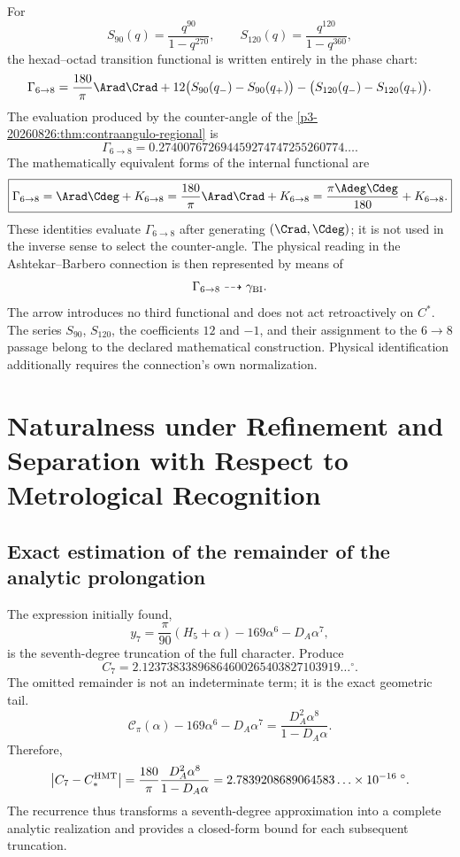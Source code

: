 For
\[
S_{90}(q)=\frac{q^{90}}{1-q^{270}},
\qquad
S_{120}(q)=\frac{q^{120}}{1-q^{360}},
\]
the hexad--octad transition functional is written entirely in the
phase chart:
\[
\Gamma_{6\to8}
=\frac{180}{\pi}\Arad\Crad
+12\bigl(S_{90}(q_-)-S_{90}(q_+)\bigr)
-\bigl(S_{120}(q_-)-S_{120}(q_+)\bigr).
\]
The evaluation produced by the counter-angle of the
\cref{p3-20260826:thm:contraangulo-regional} is
\[
\boxed{
\Gamma_{6\to8}
=0.274007672694459274747255260774\ldots.}
\]
The mathematically equivalent forms of the internal functional are
\[
\boxed{
\Gamma_{6\to8}
=\Arad\Cdeg+K_{6\to8}
=\frac{180}{\pi}\Arad\Crad+K_{6\to8}
=\frac{\pi\Adeg\Cdeg}{180}+K_{6\to8}.}
\]
These identities evaluate \(\Gamma_{6\to8}\) after generating
\((\Crad,\Cdeg)\); it is not used in the inverse sense to select the
counter-angle. The physical reading in the Ashtekar--Barbero connection is
then represented by means of
\[
 \Gamma_{6\to8}\dashrightarrow\gamma_{\rm BI}.
\]
The arrow introduces no third functional and does not act retroactively on \(C^*\). The
series \(S_{90}\), \(S_{120}\), the coefficients \(12\) and \(-1\), and their
assignment to the \(6\to8\) passage belong to the declared mathematical
construction. Physical identification additionally requires the connection's own
normalization.

\section{Naturalness under Refinement and Separation with Respect to Metrological Recognition}
\label{sec:s102:c38:7}

\subsection{Exact estimation of the remainder of the analytic prolongation}
\label{sec:s102:c38:7:1}


The expression initially found,
\[
y_7=\frac\pi{90}(H_5+\alpha)-169\alpha^6-D_A\alpha^7,
\]
is the seventh-degree truncation of the full character. Produce
\[
C_7=2.12373833896864600265403827103919\ldots{}^\circ.
\]
The omitted remainder is not an indeterminate term; it is the exact geometric tail.
\[
\mathscr C_\pi(\alpha)
-169\alpha^6-D_A\alpha^7
=\frac{D_A^2\alpha^8}{1-D_A\alpha}.
\]
Therefore,
\[
\left|C_7-C_*^{\rm HMT}\right|
=\frac{180}{\pi}\frac{D_A^2\alpha^8}{1-D_A\alpha}
=2.7839208689064583\ldots\times10^{-16}\;{}^\circ.
\]
The recurrence thus transforms a seventh-degree approximation into a
complete analytic realization and provides a closed-form bound for each
subsequent truncation.

